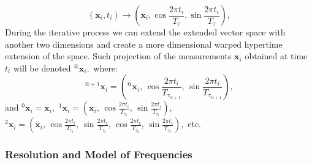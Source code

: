 \begin{equation}
\left(\mathbf{x}_i, t_i\right) \rightarrow \left(\mathbf{x}_i, \cos{\frac{2\pi t_{i}}{T_{\tau}}}, \sin{\frac{2\pi t_{i}}{T_{\tau}}}\right),
\end{equation}
%
During the iterative process we can extend the extended vector space with another two dimensions and create a more dimensional warped hypertime extension of the space. 
Such projection of the measurements $\mathbf{x}_i$ obtained at time $t_i$ will be denoted ${}^{@}\mathbf{x}_{i},$ where:
%
\begin{equation}\label{eqn:extension}
    {}^{@+1}\mathbf{x}_{i} = \left({}^{@}\mathbf{x}_{i}, \,\cos{\frac{2\pi t_{i}}{T_{\tau_{@+1}}}}, \, \sin{\frac{2\pi t_{i}}{T_{\tau_{@+1}}}}\right),
\end{equation}
%
and ${}^{0}\mathbf{x}_{i} = \mathbf{x}_{i},$ ${}^{1}\mathbf{x}_{i} = \left(\mathbf{x}_{i}, \,\cos{\frac{2\pi t_{i}}{T_{\tau_1}}}, \, \sin{\frac{2\pi t_{i}}{T_{\tau_1}}}\right),$ ${}^{2}\mathbf{x}_{i} = \left(\mathbf{x}_{i}, \,\cos{\frac{2\pi t_{i}}{T_{\tau_1}}}, \, \sin{\frac{2\pi t_{i}}{T_{\tau_1}}}, \,\cos{\frac{2\pi t_{i}}{T_{\tau_2}}}, \, \sin{\frac{2\pi t_{i}}{T_{\tau_2}}}\right),$ etc.



\subsubsection{Resolution and Model of Frequencies}\label{sec:resolution}

